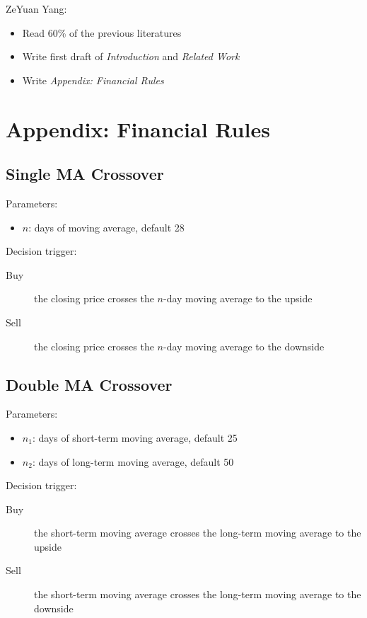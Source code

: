 \documentclass{article}
\begin{document}
\noindent
ZeYuan Yang:

\begin{itemize}
    \item Read 60\% of the previous literatures
    \item Write first draft of \textit{Introduction} and \textit{Related Work}
    \item Write \textit{Appendix: Financial Rules}
\end{itemize}





\section{Appendix: Financial Rules}\label{section-appendix-financial-rules}


\subsection{Single MA Crossover}

\setlength{\parindent}{0pt}

Parameters\cite{genetic-algorithms-for-predicting-the-egyptian-stock-market}:
\begin{itemize}
    \item $n$: days of moving average, default 28
\end{itemize}

Decision trigger:
\begin{description}
    \item[Buy] the closing price crosses the $n$-day moving average to the upside
    \item[Sell] the closing price crosses the $n$-day moving average to the downside
\end{description}

\subsection{Double MA Crossover}

Parameters\cite{genetic-algorithms-for-predicting-the-egyptian-stock-market}:
\begin{itemize}
    \item $n_1$: days of short-term moving average, default 25
    \item $n_2$: days of long-term moving average, default 50
\end{itemize}

Decision trigger:
\begin{description}
    \item[Buy] the short-term moving average crosses the long-term moving average to the upside
    \item[Sell] the short-term moving average crosses the long-term moving average to the downside
\end{description}
\end{document}
